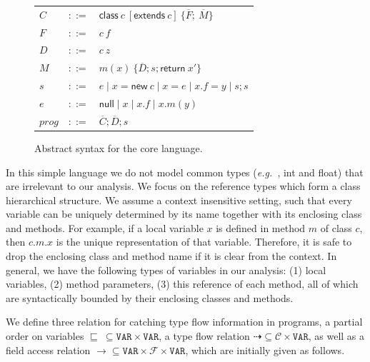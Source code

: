 \documentclass{fac}
\newcommand\eg{\textit{e.g.\ }}
\newcommand{\keyword}[1]{\mathsf{#1}}
\newcommand{\kw}[1]{\keyword{#1}}
\newcommand{\kwnull}[0]{\keyword{null}}
\newcommand{\kwnew}[0]{\keyword{new}}
\newcommand{\kwextends}[0]{\keyword{extends}}
\newcommand{\kwclass}[0]{\keyword{class}}
\newcommand\Var{\mathtt{VAR}}
\newcommand{\Class}{\mathcal{C}}
\newcommand{\Field}{\mathcal{F}}
\newcommand{\less}{\sqsubseteq}
\newcommand{\tflow}{\dashrightarrow}
\newcommand{\hflow}{\longrightarrow}
\begin{document}
\begin{figure}\centering
	\begin{tabular}[c]{lll}
		$C$&$::=$&$\kwclass\ c\ [\kwextends\ c] \ \{\overline{F};\ \overline{M}\}$\\
        $F$&$::=$&$c \ f$\\
        $D$&$::=$&$c \ z$\\
		$M$&$::=$&$m(x) \ \{\overline{D}; s; \kw{return}\ x'\}$\\
		$s$&$::=$&$e\mid x{=}\kwnew \ c\mid  x {=} e \mid x.f{=}y \mid s;s$\\

		$e$&$::=$&$ \kwnull\mid x \mid x.f \mid x.m(y) $\\
        $prog$&$::=$&$\overline{C};\overline{D}; s$\\
	\end{tabular}
	\caption{Abstract syntax for the core language. \label{fig:syntax}}
\end{figure}

In this simple language we do not model common types (\eg, int and float) that are irrelevant to our analysis. We focus on the reference types which form a class hierarchical structure. We assume a context insensitive setting, such that every variable can be uniquely determined by its name together with its enclosing class and methods.
For example, if a local variable $x$ is defined in method $m$ of class $c$, then $c.m.x$ is the unique representation of that variable. Therefore, it is safe to drop the enclosing class and method name if it is clear from the context.
In general, we have the following types of variables in our analysis: (1) local variables, (2) method parameters, (3) this reference of each method, all of which are syntactically bounded by their enclosing classes and methods.

We define three relation for catching type flow information in programs, a partial order on variables $\less\ \subseteq\Var\times\Var$, a type flow relation
$\tflow\subseteq\Class\times\Var$, as well as a field access relation $\hflow\subseteq\Var\times\Field\times\Var$,
which are initially given as follows.
\end{document}
